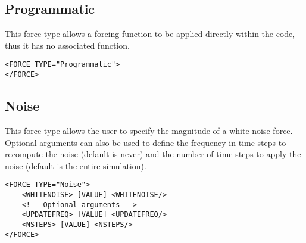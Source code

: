 \subsection{Programmatic}
This force type allows a forcing function to be applied directly within the code, thus it has no associated function. 

\begin{lstlisting}[style=XMLStyle] 
<FORCE TYPE="Programmatic">
</FORCE>
\end{lstlisting}


\subsection{Noise}
This force type allows the user to specify the magnitude of a white noise force. 
Optional arguments can also be used to define the frequency in time steps to recompute the noise (default is never)
 and the number of time steps to apply the noise (default is the entire simulation).  

\begin{lstlisting}[style=XMLStyle] 
<FORCE TYPE="Noise">
    <WHITENOISE> [VALUE] <WHITENOISE/>
    <!-- Optional arguments -->
    <UPDATEFREQ> [VALUE] <UPDATEFREQ/>
    <NSTEPS> [VALUE] <NSTEPS/>
</FORCE>
\end{lstlisting}
